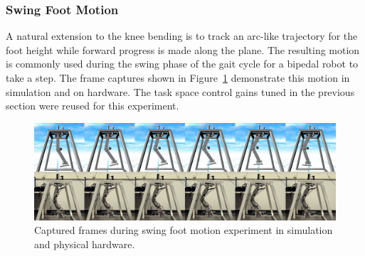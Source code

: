 
\subsubsection{Swing Foot Motion} %
\label{ssub:swing_foot_motion}

A natural extension to the knee bending is to track an arc-like trajectory for the foot height while forward progress is made along the plane. The resulting motion is commonly used during the swing phase of the gait cycle for a bipedal robot to take a step. The frame captures shown in Figure~\ref{fig:swingmotionframes} demonstrate this motion in simulation and on hardware. The task space control gains tuned in the previous section were reused for this experiment. 

\begin{figure}[!t]
	\centering
    \includegraphics[scale=0.145]{fig/experiments/swingmotionframes.png} 
  	\caption{Captured frames during swing foot motion experiment in simulation and physical hardware.}
	\label{fig:swingmotionframes}
\end{figure}

